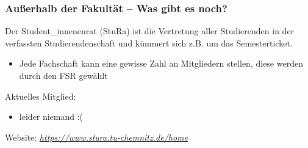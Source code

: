 \documentclass[10pt]{beamer}
\makeatletter
\newcommand{\highl}[1]{\color{tuccolor@ma}#1\color{black}}
\makeatother
\begin{document}

\begin{frame}
	\frametitle{Außerhalb der Fakultät -- Was gibt es noch?}
	
	\begin{block}{\vphantom{X}}
		Der Student\_innenenrat (StuRa) ist die Vertretung aller Studierenden in der verfassten Studierendenschaft und kümmert sich z.B. um das Semesterticket.
	\end{block}

	\begin{itemize}
		\item Jede Fachschaft kann eine gewisse Zahl an Mitgliedern stellen, diese werden durch den FSR gewählt
	\end{itemize}

	\vspace*{0.5cm}

	Aktuelles Mitglied:

	\begin{itemize}
		\item leider niemand :(
	\end{itemize}

	\vspace*{0.5cm}

	Website: \highl{\textit{\href{https://www.stura.tu-chemnitz.de/home}{https://www.stura.tu-chemnitz.de/home}}}
\end{frame}
\end{document}
